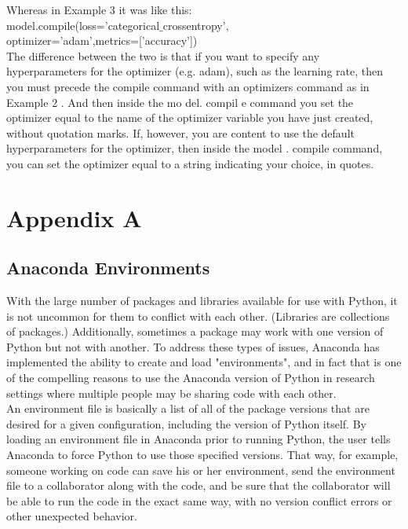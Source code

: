 \documentclass{book}
\theoremstyle{plain}
\theoremstyle{definition}
\numberwithin{exm}{chapter}
\theoremstyle{remark}
\theoremstyle{summary}
\theoremstyle{overview}
\begin{document}
Whereas in Example 3 it was like this:\\
model.compile(loss='categorical$\_$crossentropy',\\
optimizer='adam',metrics=['accuracy'])\\

The difference between the two is that if you want to specify any hyperparameters for the optimizer (e.g. adam), such as the learning rate, then you must precede the compile command with an optimizers command as in Example 2 . And then inside the mo del. compil e command you set the optimizer equal to the name of the optimizer variable you have just created, without quotation marks. If, however, you are content to use the default hyperparameters for the optimizer, then inside the model . compile command, you can set the optimizer equal to a string indicating your choice, in quotes.


\chapter*{Appendix A}
\section*{Anaconda Environments}
With the large number of packages and libraries available for use with Python, it is not uncommon for them to conflict with each other. (Libraries are collections of packages.) Additionally, sometimes a package may work with one version of Python but not with another. To address these types of issues, Anaconda has implemented the ability to create and load "environments", and in fact that is one of the compelling reasons to use the Anaconda version of Python in research settings where multiple people may be sharing code with each other.\\

An environment file is basically a list of all of the package versions that are desired for a given configuration, including the version of Python itself. By loading an environment file in Anaconda prior to running Python, the user tells Anaconda to force Python to use those specified versions. That way, for example, someone working on code can save his or her environment, send the environment file to a collaborator along with the code, and be sure that the collaborator will be able to run the code in the exact same way, with no version conflict errors or other unexpected behavior.\\
\end{document}
